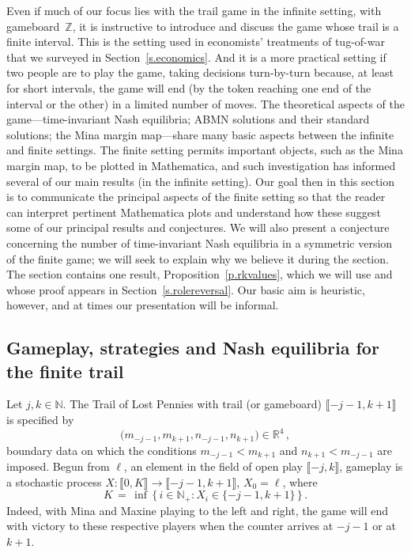 \documentclass[letterpaper,11pt,oneside,reqno]{amsbook}
\newcommand{\N}{\ensuremath{\mathbb{N}}}
\newcommand{\R}{\ensuremath{\mathbb{R}}}
\newcommand{\Z}{\ensuremath{\mathbb{Z}}}
\numberwithin{figure}{chapter}
\theoremstyle{definition}
\theoremstyle{definition}
\theoremstyle{definition}
\theoremstyle{definition}
\theoremstyle{definition}
\newcommand{\nwithzero}{\N}
\newcommand{\nwithoutzero}{\N_+}
\newcommand{\game}{{\rm Trail}}
\newcommand{\abmnmacspace}{\textrm{ABMN} }
\begin{document}
 Even if much of our focus lies with the trail game in the infinite setting, with gameboard~$\Z$,
 it is instructive to introduce and discuss the game whose trail is a finite interval.
 This is the setting used in  economists' treatments of tug-of-war that we surveyed in Section~\ref{s.economics}. 
And it is a more practical setting if two people are to play the game, taking decisions turn-by-turn because, at least for short intervals, the game will end (by the token reaching one end of the interval or the other) in a limited number of moves. The theoretical aspects of the game---time-invariant Nash equilibria; \abmnmacspace solutions and their standard solutions; the Mina margin map---share many basic aspects between the infinite and finite settings. The finite setting permits important objects, such as the Mina margin map, to be plotted in Mathematica, and such investigation has informed several of our main results (in the infinite setting). Our goal then in this section is to communicate the principal aspects of the finite setting so that the reader can interpret pertinent Mathematica plots and understand how these suggest some of our principal results and conjectures. We will also present a conjecture concerning the number of time-invariant Nash equilibria in a symmetric version of the finite game; we will seek to explain why we believe it during the section.  The section contains one result, Proposition~\ref{p.rkvalues}, which we will use and whose proof appears in Section~\ref{s.rolereversal}.
Our basic aim is heuristic, however, and at times our presentation will be informal.

\subsection{Gameplay, strategies and Nash equilibria for the finite trail}\label{s.gsn}
 
Let $j,k \in \nwithzero$. The Trail of Lost Pennies with trail (or gameboard) $\llbracket -j-1,k+1\rrbracket$ 
is specified by 
$$
\big( m_{-j-1},m_{k+1},n_{-j-1},n_{k+1} \big) \in \R^4 \, , 
$$
boundary data  on which the conditions $m_{-j-1} < m_{k+1}$ and $n_{k+1} < m_{-j-1}$ are imposed.
Begun from $\ell$, an element in the field of open play $\llbracket -j,k \rrbracket$, gameplay is a stochastic process $X: \llbracket 0, K \rrbracket \to \llbracket -j-1,k+1 \rrbracket$,  $X_0 = \ell$, where 
$$
K \, = \, \inf \, \Big\{ \, i \in \nwithoutzero: X_i \in \{ -j-1,k+1 \} \, \Big\} \, .
$$
Indeed, with Mina and Maxine playing to the left and right,
the game will end with victory to these respective players when the counter arrives at $-j-1$ or at $k+1$. 
\end{document}

